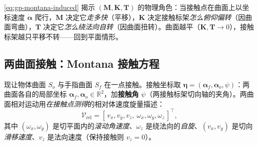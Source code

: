 \begin{insight}[几何参数 $=$ 标架运动的“传动比”]
\cref{eq:gp-montana-induced} 揭示 $(\mathbf{M},\mathbf{K},\mathbf{T})$ 的物理角色：当接触点在曲面上以坐标速度 $\dot{\boldsymbol{\alpha}}$ 爬行，$\mathbf{M}$ 决定它\emph{走多快}（平移），$\mathbf{K}$ 决定接触标架\emph{怎么俯仰偏转}（因曲面弯曲），$\mathbf{T}$ 决定它\emph{怎么绕法向自转}（因曲面扭转）。曲面越平（$\mathbf{K},\mathbf{T}\to 0$），接触标架越只平移不转——回到平面情形。
\end{insight}

\subsection{两曲面接触：Montana 接触方程}
现让物体曲面 $S_o$ 与手指曲面 $S_f$ 在一点接触。接触坐标取 $\boldsymbol{\eta}=(\boldsymbol{\alpha}_f,\boldsymbol{\alpha}_o,\psi)$：两曲面各自的局部坐标 $\boldsymbol{\alpha}_f,\boldsymbol{\alpha}_o\in\mathbb{R}^2$，加\textbf{接触角} $\psi$（两接触标架切向轴的夹角）。两曲面相对运动用\emph{在接触点测得}的相对体速度旋量描述：
\begin{equation}
  \boldsymbol{\mathcal{V}}_{\text{rel}}=[\,v_x,v_y,v_z,\ \omega_x,\omega_y,\omega_z\,]^\top,
  \label{eq:gp-rel-twist}
\end{equation}
其中 $(\omega_x,\omega_y)$ 是切平面内的\emph{滚动角速度}、$\omega_z$ 是绕法向的\emph{自旋}、$(v_x,v_y)$ 是切向\emph{滑移速度}、$v_z$ 是法向速度（保持接触则 $v_z=0$）。


